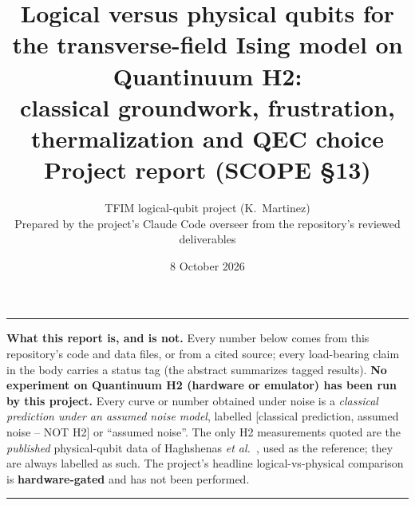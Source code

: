 \documentclass[11pt,a4paper]{article}
\title{Logical versus physical qubits for the transverse-field Ising model on Quantinuum H2:\\
\large classical groundwork, frustration, thermalization and QEC choice\\[2pt]
\normalsize Project report (SCOPE \S13)}
\author{TFIM logical-qubit project (K.~Martinez)\\
\small Prepared by the project's Claude Code overseer from the repository's reviewed deliverables}
\date{8 October 2026}
\newcommand{\tg}[1]{\textsf{\small[#1]}}
\newcommand{\cp}{\tg{classical prediction, assumed noise -- NOT H2}}
\newenvironment{statusbox}{\begin{center}\begin{minipage}{0.94\linewidth}\hrule\vspace{4pt}\small}%
{\vspace{4pt}\hrule\end{minipage}\end{center}}
\begin{document}
\maketitle

\begin{statusbox}
\textbf{What this report is, and is not.}
Every number below comes from this repository's code and data files, or from a cited source; every load-bearing
claim in the body carries a status tag (the abstract summarizes tagged results). \textbf{No experiment on Quantinuum H2 (hardware or emulator) has been run by this project.}
Every curve or number obtained under noise is a \emph{classical prediction under an assumed noise model},
labelled \cp{} or ``assumed noise''. The only H2 measurements quoted are the \emph{published} physical-qubit data
of Haghshenas \emph{et al.}~\cite{haghshenas}, used as the reference; they are always labelled as such.
The project's headline logical-vs-physical comparison is \textbf{hardware-gated} and has not been performed.
\end{statusbox}
\end{document}
